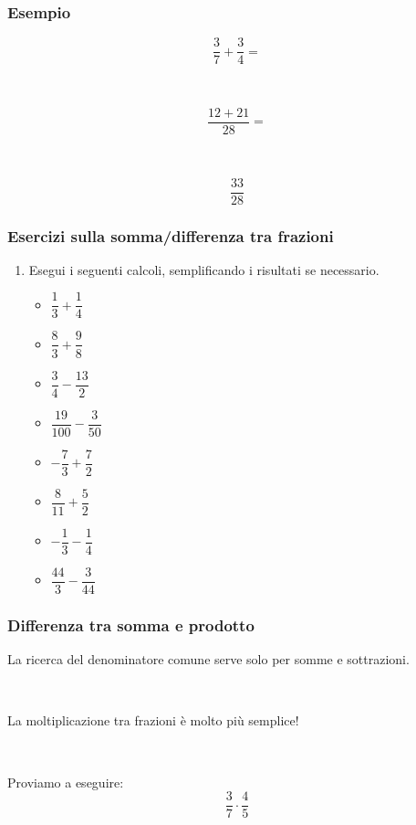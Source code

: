 \documentclass[]{beamer}
\theoremstyle{plain}
\begin{document}
\begin{frame}
\frametitle{Esempio}
\[ \frac{3}{7} + \frac{3}{4} = \]\pause

~

\[ \frac{12+21}{28} =  \]\pause

~

\[ \frac{33}{28} \]
\end{frame}

\begin{frame}
\frametitle{Esercizi sulla somma/differenza tra frazioni}
\begin{enumerate}
  \item Esegui i seguenti calcoli, semplificando i risultati se necessario.
  \begin{multicols}{2}
    \begin{itemize}
        \item $ \dfrac{1}{3} + \dfrac{1}{4} $
        
        \vspace*{.5cm}
        \item $ \dfrac{8}{3} + \dfrac{9}{8} $
        
        \vspace*{.5cm}
        \item $ \dfrac{3}{4} - \dfrac{13}{2} $
        
        \vspace*{.5cm}
        \item $ \dfrac{19}{100} - \dfrac{3}{50} $
        \item $ -\dfrac{7}{3} + \dfrac{7}{2} $
        
        \vspace*{.5cm}
        \item $ \dfrac{8}{11} + \dfrac{5}{2} $
        
        \vspace*{.5cm}
        \item $ -\dfrac{1}{3} - \dfrac{1}{4} $
        
        \vspace*{.5cm}
        \item $ \dfrac{44}{3} - \dfrac{3}{44}  $
    \end{itemize}
  \end{multicols}
\end{enumerate}
\end{frame}


\begin{frame}
\frametitle{Differenza tra somma e prodotto}
La ricerca del denominatore comune serve solo per somme e sottrazioni.\pause

~

\alert{La moltiplicazione tra frazioni è molto più semplice!}\pause

~

Proviamo a eseguire:
\[ \frac{3}{7} \cdot \frac{4}{5}\]
\end{frame}
\end{document}
